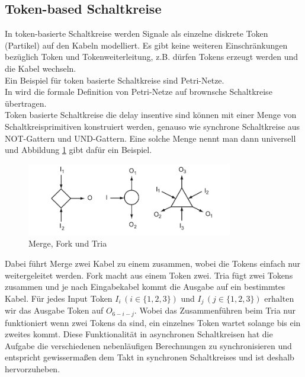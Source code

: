 \documentclass[11pt,a4paper]{article}
\begin{document}

\subsection{Token-based Schaltkreise}
In token-basierte Schaltkreise werden Signale als einzelne diskrete
Token (Partikel) auf den Kabeln modelliert.
%
Es gibt keine weiteren Einschränkungen bezüglich Token und Tokenweiterleitung,
z.B. dürfen Tokens erzeugt werden und die Kabel wechseln. \\
%
Ein Beispiel für token basierte Schaltkreise sind Petri-Netze. \\
%
In \cite{Peper_Fundamentals_2013} wird die formale Definition von Petri-Netze
auf brownsche Schaltkreise übertragen. \\
%
Token basierte Schaltkreise die delay insentive sind können mit 
einer Menge von Schaltkreisprimitiven konstruiert werden, genauso 
wie synchrone Schaltkreise aus NOT-Gattern und UND-Gattern.
%
Eine solche Menge nennt man dann universell und Abbildung \ref{fig:tokenBased}
gibt dafür ein Beispiel.


\begin{figure}[h]
       \centering
       \includegraphics[width=9cm]{bilder/tokenBased.png}
       \caption{Merge, Fork und Tria}
       \label{fig:tokenBased}
\end{figure}    


Dabei führt Merge zwei Kabel zu einem zusammen, wobei die Tokens einfach 
nur weitergeleitet werden.
% 
Fork macht aus einem Token zwei.
%
Tria fügt zwei Tokens zusammen und je nach Eingabekabel kommt
die Ausgabe auf ein bestimmtes Kabel.
%
Für jedes Input Token  $ I_{i} \, (i \in \{1, 2, 3\}) $ und $ I_{j} \, (j \in 
\{1, 2, 3\}) $ erhalten wir das Ausgabe Token auf $O_{6-i-j}$.
%
Wobei das Zusammenführen beim Tria nur funktioniert wenn zwei Tokens da sind,
ein einzelnes Token wartet solange bis ein zweites kommt.
%
Diese Funktionalität in asynchronen Schaltkreisen hat die Aufgabe die 
verschiedenen nebenläufigen Berechnungen zu synchronisieren und entspricht
gewissermaßen dem Takt in synchronen Schaltkreises
und ist deshalb hervorzuheben.
%
\end{document}
